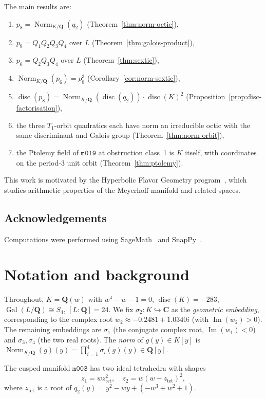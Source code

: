 \documentclass[12pt]{amsart}
\theoremstyle{definition}
\newcommand{\QQ}{\mathbf{Q}}
\newcommand{\CC}{\mathbf{C}}
\DeclareMathOperator{\Norm}{Norm}
\DeclareMathOperator{\Gal}{Gal}
\DeclareMathOperator{\disc}{disc}
\newcommand{\M}{\texttt{m003}}
\newcommand{\mzero}{\texttt{m019}}
\begin{document}
The main results are:
\begin{enumerate}
\item $p_8 = \Norm_{K/\QQ}(q_2)$ (Theorem~\ref{thm:norm-octic}),
\item $p_8 = Q_1 Q_2 Q_3 Q_4$ over $L$ (Theorem~\ref{thm:galois-product}),
\item $p_6 = Q_2 Q_3 Q_4$ over $L$ (Theorem~\ref{thm:sextic}),
\item $\Norm_{K/\QQ}(p_6) = p_8^3$ (Corollary~\ref{cor:norm-sextic}),
\item $\disc(p_8) = \Norm_{K/\QQ}(\disc(q_2)) \cdot \disc(K)^2$
  (Proposition~\ref{prop:disc-factorisation}),
\item the three $T_1$-orbit quadratics each have norm an irreducible
  octic with the same discriminant and Galois group
  (Theorem~\ref{thm:norm-orbit}),
\item the Ptolemy field of $\mzero$ at obstruction class~1 is $K$ itself,
  with coordinates on the period-3 unit orbit
  (Theorem~\ref{thm:ptolemy}).
\end{enumerate}

This work is motivated by the Hyperbolic Flavor Geometry
program~\cite{Gen26a}, which studies arithmetic properties
of the Meyerhoff manifold and related spaces.

\subsection*{Acknowledgements}
Computations were performed using SageMath~\cite{Sage} and
SnapPy~\cite{CDGW}.

\section{Notation and background}

Throughout, $K = \QQ(w)$ with $w^4 - w - 1 = 0$, $\disc(K) = -283$,
$\Gal(L/\QQ) \cong S_4$, $[L:\QQ] = 24$.
We fix $\sigma_2 : K \hookrightarrow \CC$ as the \emph{geometric embedding},
corresponding to the complex root $w_2 \approx -0.2481 + 1.0340i$
(with $\operatorname{Im}(w_2) > 0$).
The remaining embeddings are $\sigma_1$ (the conjugate complex root,
$\operatorname{Im}(w_1) < 0$) and $\sigma_3, \sigma_4$ (the two real roots).
The \emph{norm} of $g(y) \in K[y]$ is
$\Norm_{K/\QQ}(g)(y) = \prod_{i=1}^{4} \sigma_i(g)(y) \in \QQ[y]$.

The cusped manifold $\M$ has two ideal tetrahedra with shapes
\[
  z_1 = w z_{\mathrm{tet}}^2,\quad z_2 = w(w - z_{\mathrm{tet}})^2,
\]
where $z_{\mathrm{tet}}$ is a root of $q_2(y) = y^2 - wy + (-w^3+w^2+1)$.
\end{document}
